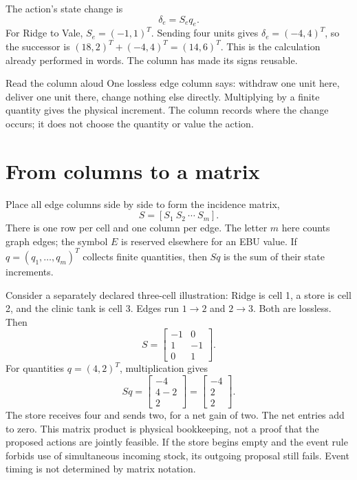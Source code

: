The action's state change is
\begin{equation}
 \delta_e=S_e q_e.
\end{equation}
For Ridge to Vale, \(S_e=(-1,1)^T\). Sending four units gives \(\delta_e=(-4,4)^T\), so the successor is \((18,2)^T+(-4,4)^T=(14,6)^T\). This is the calculation already performed in words. The column has made its signs reusable.

\begin{intuitionbox}{Read the column aloud}
One lossless edge column says: withdraw one unit here, deliver one unit there, change nothing else directly. Multiplying by a finite quantity gives the physical increment. The column records where the change occurs; it does not choose the quantity or value the action.
\end{intuitionbox}

\section{From columns to a matrix}
Place all edge columns side by side to form the incidence matrix,
\begin{equation}
 S=[S_1\ S_2\ \cdots\ S_m].
\end{equation}
There is one row per cell and one column per edge. The letter \(m\) here counts graph edges; the symbol \(E\) is reserved elsewhere for an EBU value. If \(q=(q_1,\ldots,q_m)^T\) collects finite quantities, then \(Sq\) is the sum of their state increments.

Consider a separately declared three-cell illustration: Ridge is cell 1, a store is cell 2, and the clinic tank is cell 3. Edges run \(1\to2\) and \(2\to3\). Both are lossless. Then
\begin{equation}
 S=\begin{bmatrix}-1&0\\1&-1\\0&1\end{bmatrix}.
\end{equation}
For quantities \(q=(4,2)^T\), multiplication gives
\begin{equation}
 Sq=\begin{bmatrix}-4\\4-2\\2\end{bmatrix}
    =\begin{bmatrix}-4\\2\\2\end{bmatrix}.
\end{equation}
The store receives four and sends two, for a net gain of two. The net entries add to zero. This matrix product is physical bookkeeping, not a proof that the proposed actions are jointly feasible. If the store begins empty and the event rule forbids use of simultaneous incoming stock, its outgoing proposal still fails. Event timing is not determined by matrix notation.


